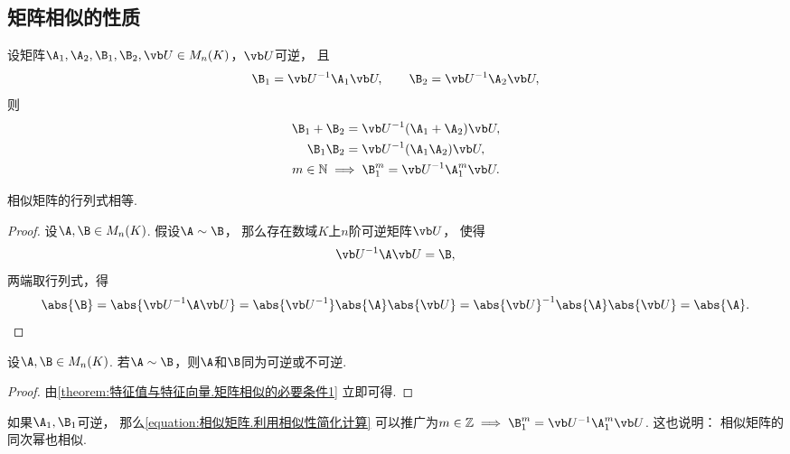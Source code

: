 \subsection{矩阵相似的性质}
\begin{proposition}
设矩阵\(\A_1,\A_2,\B_1,\B_2,\P \in M_n(K)\)，\(\P\)可逆，
且\[
	\B_1=\P^{-1}\A_1\P, \qquad
	\B_2=\P^{-1}\A_2\P,
\]
则\begin{gather}
	\B_1 + \B_2 = \P^{-1} (\A_1 + \A_2) \P, \\
	\B_1 \B_2 = \P^{-1} (\A_1 \A_2) \P, \\
	m\in\mathbb{N} \implies \B_1^m = \P^{-1}\A_1^m\P.
		\label{equation:相似矩阵.利用相似性简化计算}
\end{gather}
\end{proposition}

\begin{property}\label{theorem:特征值与特征向量.矩阵相似的必要条件1}
相似矩阵的行列式相等.
\begin{proof}
设\(\A,\B \in M_n(K)\).
假设\(\A\sim\B\)，
那么存在数域\(K\)上\(n\)阶可逆矩阵\(\P\)，
使得\[
	\P^{-1}\A\P=\B,
\]
两端取行列式，得\[
	\abs{\B} = \abs{\P^{-1}\A\P}
	= \abs{\P^{-1}}\abs{\A}\abs{\P}
	= \abs{\P}^{-1}\abs{\A}\abs{\P}
	= \abs{\A}.
	\qedhere
\]
\end{proof}
\end{property}
\begin{proposition}
设\(\A,\B \in M_n(K)\).
若\(\A\sim\B\)，则\(\A\)和\(\B\)同为可逆或不可逆.
\begin{proof}
由\cref{theorem:特征值与特征向量.矩阵相似的必要条件1} 立即可得.
\end{proof}
\end{proposition}
\begin{remark}
如果\(\A_1,\B_1\)可逆，
那么\cref{equation:相似矩阵.利用相似性简化计算}
可以推广为\(m\in\mathbb{Z} \implies \B_1^m = \P^{-1}\A_1^m\P\).
这也说明：
相似矩阵的同次幂也相似.
\end{remark}


